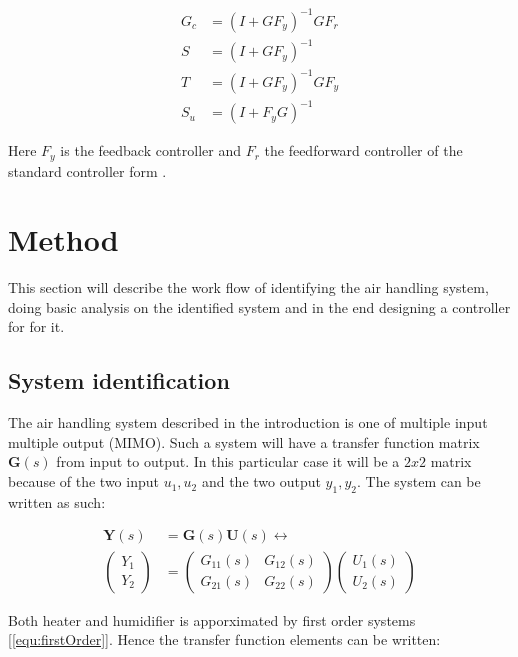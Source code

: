 \documentclass[a4paper, titlepage]{article}
\begin{document}
\begin{equation}
\begin{split}
G_c &= (I + GF_y)^{-1}GF_r \\
S &= (I + GF_y)^{-1} \\
T &= (I + GF_y)^{-1}GF_y \\
S_u &= (I + F_yG)^{-1}
\end{split}
\label{equ:transFunc}
\end{equation}

Here $F_y$ is the feedback controller and $F_r$ the feedforward controller of the standard controller form \citep[p.~147]{glad00}.

\section{Method}
This section will describe the work flow of identifying the air handling system, doing basic analysis on the identified system and in the end designing a controller for for it.

\subsection{System identification}
The air handling system described in the introduction is one of multiple input multiple output (MIMO).
Such a system will have a transfer function matrix $\boldsymbol{G}(s)$ from input to output. In this particular case it will be a $2x2$ matrix because of the two input $u_1, u_2$ and the two output $y_1, y_2$.
The system can be written as such:

\begin{equation}
\begin{split}
\boldsymbol{Y}(s) &= \boldsymbol{G}(s)\boldsymbol{U}(s) \leftrightarrow \\
\begin{pmatrix}
Y_1 \\ Y_2
\end{pmatrix}
&=
\begin{pmatrix}
G_{11}(s) & G_{12}(s) \\ G_{21}(s) & G_{22}(s)
\end{pmatrix}
\begin{pmatrix}
U_1(s) \\ U_2(s)
\end{pmatrix}
\end{split}
\end{equation}

Both heater and humidifier is apporximated by first order systems [\ref{equ:firstOrder}].
Hence the transfer function elements can be written:
\end{document}
